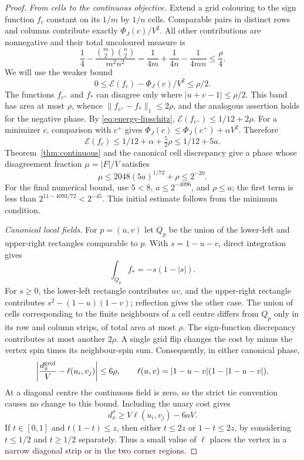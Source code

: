 \begin{proof}
\emph{From cells to the continuous objective.}
Extend a grid colouring to the sign function $f_c$ constant on its
$1/m$ by $1/n$ cells.  Comparable pairs in distinct rows and columns
contribute exactly $\Phi_J(c)/V^2$.  All other contributions are
nonnegative and their total uncoloured measure is
\[
 \frac14-\frac{\binom m2\binom n2}{m^2n^2}
 =\frac1{4m}+\frac1{4n}-\frac1{4mn}\le\frac\rho4.
\]
We will use the weaker bound
\begin{equation}
 0\le\mathcal E(f_c)-\Phi_J(c)/V^2\le\rho/2.
 \label{eq:cell-comparison}
\end{equation}
The functions $f_{c^+}$ and $f_*$ can disagree only where
$|u+v-1|\le\rho/2$.  This band has area at most $\rho$, whence
$\|f_{c^+}-f_*\|_1\le2\rho$, and the analogous assertion holds for
the negative phase.  By \eqref{eq:energy-lipschitz},
$\mathcal E(f_{c^+})\le1/12+2\rho$.
For a minimizer $c$, comparison with $c^+$ gives
$\Phi_J(c)\le\Phi_J(c^+)+\alpha V^2$.  Therefore
\[
 \mathcal E(f_c)\le1/12+\alpha+\tfrac52\rho\le1/12+5a.
\]
Theorem~\ref{thm:continuous} and the canonical cell discrepancy give a
phase whose disagreement fraction $\mu=|F|/V$ satisfies
\begin{equation}
 \mu\le2048(5a)^{1/72}+\rho\le2^{-20}.
 \label{eq:initial-fraction}
\end{equation}
For the final numerical bound, use $5<8$, $a\le2^{-4096}$, and
$\rho\le a$; the first term is less than $2^{11-4093/72}<2^{-45}$.
This initial estimate follows from the minimum condition.

\emph{Canonical local fields.}
For $p=(u,v)$ let $Q_p$ be the union of the lower-left and upper-right
rectangles comparable to $p$.  With $s=1-u-v$, direct integration gives
\[
 \int_{Q_p}f_*=-s(1-|s|).
\]
For $s\ge0$, the lower-left rectangle contributes $uv$, and the
upper-right rectangle contributes $s^2-(1-u)(1-v)$; reflection gives the
other case.  The union of cells corresponding to the finite neighbours of
a cell centre differs from $Q_p$ only in its row and column strips,
of total area at most $\rho$.  The sign-function discrepancy contributes
at most another $2\rho$.  A single grid flip changes the cost by minus
the vertex spin times its neighbour-spin sum.  Consequently, in either
canonical phase,
\begin{equation}
 \left|\frac{d_x^{\rm grid}}V-\ell(u_i,v_j)\right|\le6\rho,
 \qquad
 \ell(u,v)=|1-u-v|(1-|1-u-v|).
 \label{eq:canonical-field}
\end{equation}
At a diagonal centre the continuous field is zero, so the strict tie
convention causes no change to this bound.  Including the unary cost gives
\begin{equation}
 d_x^\sigma\ge V\ell(u_i,v_j)-6aV.
 \label{eq:field-with-unaries}
\end{equation}
If $t\in[0,1]$ and $t(1-t)\le z$, then either $t\le2z$ or
$1-t\le2z$, by considering $t\le1/2$ and $t\ge1/2$ separately.
Thus a small value of $\ell$ places the vertex in a narrow diagonal strip
or in the two corner regions.


\end{proof}
